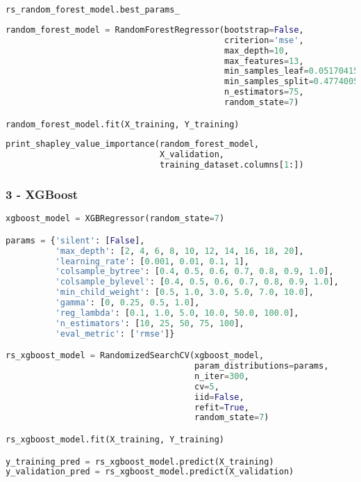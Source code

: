 \begin{lstlisting}[language=Python]
rs_random_forest_model.best_params_
\end{lstlisting}

\begin{lstlisting}[language=Python]
random_forest_model = RandomForestRegressor(bootstrap=False,
                                            criterion='mse',
                                            max_depth=10,
                                            max_features=13,
                                            min_samples_leaf=0.05170415106602393,
                                            min_samples_split=0.4774005510811298,
                                            n_estimators=75,
                                            random_state=7)

random_forest_model.fit(X_training, Y_training)
\end{lstlisting}

\begin{lstlisting}[language=Python]
print_shapley_value_importance(random_forest_model,
                               X_validation,
                               training_dataset.columns[1:])
\end{lstlisting}

\hypertarget{xgboost}{%
\subsubsection{3 - XGBoost}\label{xgboost}}

\begin{lstlisting}[language=Python]
xgboost_model = XGBRegressor(random_state=7)

params = {'silent': [False],
          'max_depth': [2, 4, 6, 8, 10, 12, 14, 16, 18, 20],
          'learning_rate': [0.001, 0.01, 0.1, 1],
          'colsample_bytree': [0.4, 0.5, 0.6, 0.7, 0.8, 0.9, 1.0],
          'colsample_bylevel': [0.4, 0.5, 0.6, 0.7, 0.8, 0.9, 1.0],
          'min_child_weight': [0.5, 1.0, 3.0, 5.0, 7.0, 10.0],
          'gamma': [0, 0.25, 0.5, 1.0],
          'reg_lambda': [0.1, 1.0, 5.0, 10.0, 50.0, 100.0],
          'n_estimators': [10, 25, 50, 75, 100],
          'eval_metric': ['rmse']}

rs_xgboost_model = RandomizedSearchCV(xgboost_model,
                                      param_distributions=params,
                                      n_iter=300,
                                      cv=5,
                                      iid=False,
                                      refit=True,
                                      random_state=7)

rs_xgboost_model.fit(X_training, Y_training)

y_training_pred = rs_xgboost_model.predict(X_training)
y_validation_pred = rs_xgboost_model.predict(X_validation)
\end{lstlisting}

